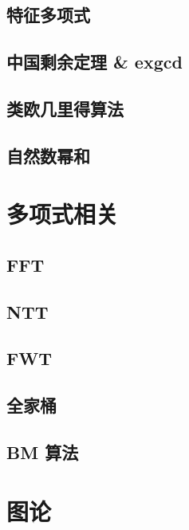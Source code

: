 \documentclass[a4paper,12pt]{article}
\begin{document}
\subsection{特征多项式}

\subsection{中国剩余定理 \& exgcd}

\subsection{类欧几里得算法}

\subsection{自然数幂和}


\section{多项式相关}

\subsection{FFT}

\subsection{NTT}

\subsection{FWT}

\subsection{全家桶}

\subsection{BM 算法}


\section{图论}
\end{document}
